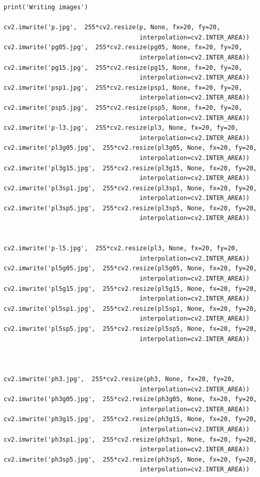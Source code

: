 \documentclass{article}
\begin{document}
\begin{verbatim}
print('Writing images')

cv2.imwrite('p.jpg',  255*cv2.resize(p, None, fx=20, fy=20,
                                     interpolation=cv2.INTER_AREA))
cv2.imwrite('pg05.jpg',  255*cv2.resize(pg05, None, fx=20, fy=20,
                                     interpolation=cv2.INTER_AREA))
cv2.imwrite('pg15.jpg',  255*cv2.resize(pg15, None, fx=20, fy=20,
                                     interpolation=cv2.INTER_AREA))
cv2.imwrite('psp1.jpg',  255*cv2.resize(psp1, None, fx=20, fy=20,
                                     interpolation=cv2.INTER_AREA))
cv2.imwrite('psp5.jpg',  255*cv2.resize(psp5, None, fx=20, fy=20,
                                     interpolation=cv2.INTER_AREA))
cv2.imwrite('p-l3.jpg',  255*cv2.resize(pl3, None, fx=20, fy=20,
                                     interpolation=cv2.INTER_AREA))
cv2.imwrite('pl3g05.jpg',  255*cv2.resize(pl3g05, None, fx=20, fy=20,
                                     interpolation=cv2.INTER_AREA))
cv2.imwrite('pl3g15.jpg',  255*cv2.resize(pl3g15, None, fx=20, fy=20,
                                     interpolation=cv2.INTER_AREA))
cv2.imwrite('pl3sp1.jpg',  255*cv2.resize(pl3sp1, None, fx=20, fy=20,
                                     interpolation=cv2.INTER_AREA))
cv2.imwrite('pl3sp5.jpg',  255*cv2.resize(pl3sp5, None, fx=20, fy=20,
                                     interpolation=cv2.INTER_AREA))


cv2.imwrite('p-l5.jpg',  255*cv2.resize(pl3, None, fx=20, fy=20,
                                     interpolation=cv2.INTER_AREA))
cv2.imwrite('pl5g05.jpg',  255*cv2.resize(pl5g05, None, fx=20, fy=20,
                                     interpolation=cv2.INTER_AREA))
cv2.imwrite('pl5g15.jpg',  255*cv2.resize(pl5g15, None, fx=20, fy=20,
                                     interpolation=cv2.INTER_AREA))
cv2.imwrite('pl5sp1.jpg',  255*cv2.resize(pl5sp1, None, fx=20, fy=20,
                                     interpolation=cv2.INTER_AREA))
cv2.imwrite('pl5sp5.jpg',  255*cv2.resize(pl5sp5, None, fx=20, fy=20,
                                     interpolation=cv2.INTER_AREA))



cv2.imwrite('ph3.jpg',  255*cv2.resize(ph3, None, fx=20, fy=20,
                                     interpolation=cv2.INTER_AREA))
cv2.imwrite('ph3g05.jpg',  255*cv2.resize(ph3g05, None, fx=20, fy=20,
                                     interpolation=cv2.INTER_AREA))
cv2.imwrite('ph3g15.jpg',  255*cv2.resize(ph3g15, None, fx=20, fy=20,
                                     interpolation=cv2.INTER_AREA))
cv2.imwrite('ph3sp1.jpg',  255*cv2.resize(ph3sp1, None, fx=20, fy=20,
                                     interpolation=cv2.INTER_AREA))
cv2.imwrite('ph3sp5.jpg',  255*cv2.resize(ph3sp5, None, fx=20, fy=20,
                                     interpolation=cv2.INTER_AREA))



\end{verbatim}
\end{document}
